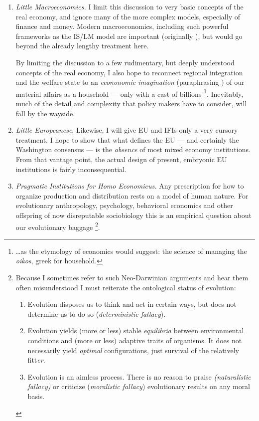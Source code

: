 \documentclass[11pt,a4paper,oneside,openright]{article}
\begin{document}
\begin{enumerate}
	\item \label{it:little-macroeconomics} \emph{Little Macroeconomics.} 
		I limit this discussion to very basic concepts of the real economy, and ignore many of the more complex models, especially of finance and money. 
		Modern macroeconomics, including such powerful frameworks as the IS/LM model are important (originally \citealt{Hicks1937}), but would go beyond the already lengthy treatment here. 

	By limiting the discussion to a few rudimentary, but deeply understood concepts of the real economy, I also hope to reconnect regional integration and the welfare state to an \emph{econonomic imagination} (paraphrasing \citealt{Mills-1959-aa}) of our material affairs as a household --- only with a cast of billions
	\footnote{
		\ldots as the etymology of economics would suggest: 
		the science of managing the \emph{oikos}, greek for household.
	}. 
	Inevitably, much of the detail and complexity that policy makers have to consider, will fall by the wayside. 

	\item \label{it:little-europeanese} \emph{Little Europeanese}. 
		Likewise, I will give \gls{EU} and \glspl{IFI}  only a very cursory treatment. 
		I hope to show that what defines the \gls{EU} --- and certainly the Washington consensus --- is the \emph{absence} of most mixed economy institutions. 
		From that vantage point, the actual design of present, embryonic \gls{EU} institutions is fairly inconsequential.

	\item \label{it:homo-economicus} \emph{Pragmatic Institutions for Homo Economicus.} 
		Any prescription for how to organize production and distribution rests on a model of human nature. 
		For evolutionary anthropology, psychology, behavioral economics and other offspring of now disreputable \citep{Wright1994} sociobiology \citep{Wilson1975} this is an empirical question about our evolutionary baggage
			\footnote{
				Because I sometimes refer to such Neo-Darwinian arguments \citep{Wright1994} and hear them often misunderstood I must reiterate the ontological status of evolution:
				\begin{enumerate}
					\item Evolution disposes us to think and act in certain ways, but does not determine us to do so (\emph{deterministic fallacy}).
					\item Evolution yields (more or less) stable \emph{equilibria} between environmental conditions and (more or less) adaptive traits of organisms. 
					It does not necessarily yield \emph{optimal} configurations, just survival of the relatively fitt\emph{er}. 
					\item Evolution is an aimless process. 
						There is no reason to praise \emph{(naturalistic fallacy)} or criticize (\emph{moralistic fallacy}) evolutionary results on any moral basis.
		\end{enumerate} 
			}.
	

\end{enumerate}
\end{document}
